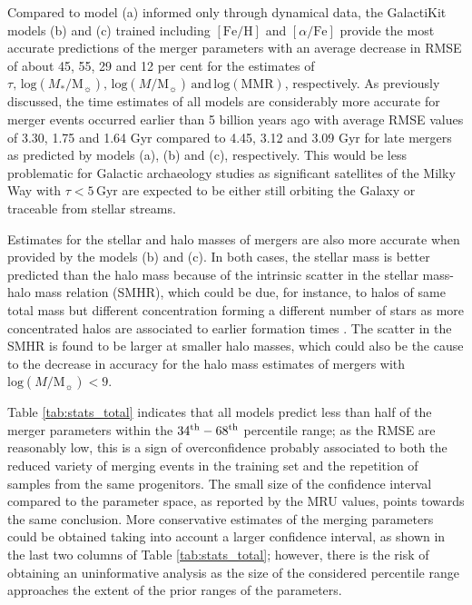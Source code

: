 Compared to model (a) informed only through dynamical data, the GalactiKit models (b) and (c) trained including $[\mathrm{Fe}/\mathrm{H}]$ and $[\alpha/\mathrm{Fe}]$ provide the most accurate predictions of the merger parameters with an average decrease in RMSE of about 45, 55, 29 and 12 per cent for the estimates of $\tau, \, \mathrm{log}(M_{*}/\mathrm{M}_{\sun}), \, \mathrm{log}(M/\mathrm{M}_{\sun}) \, \mathrm{and} \, \mathrm{log}(\text{MMR})$, respectively. As previously discussed, the time estimates of all models are considerably more accurate for merger events occurred earlier than 5 billion years ago with average RMSE values of 3.30, 1.75 and 1.64 Gyr compared to 4.45, 3.12 and 3.09 Gyr for late mergers as predicted by models (a), (b) and (c), respectively. This would be less problematic for Galactic archaeology studies as significant satellites of the Milky Way with $\tau<5\,\mathrm{Gyr}$ are expected to be either still orbiting the Galaxy or traceable from stellar streams.

Estimates for the stellar and halo masses of mergers are also more accurate when provided by the models (b) and (c). In both cases, the stellar mass is better predicted than the halo mass because of the intrinsic scatter in the stellar mass-halo mass relation (SMHR), which could be due, for instance, to halos of same total mass but different concentration forming a different number of stars as more concentrated halos are associated to earlier formation times \citep{Matthee2017}. The scatter in the SMHR is found to be larger at smaller halo masses, which could also be the cause to the decrease in accuracy for the halo mass estimates of mergers with $\mathrm{log}(M/\mathrm{M}_{\sun})<9$. 



Table \ref{tab:stats_total} indicates that all models predict less than half of the merger parameters within the $34^{\rm th}-68^{\rm th}$ percentile range; as the RMSE are reasonably low, this is a sign of overconfidence probably associated to both the reduced variety of merging events in the training set and the repetition of samples from the same progenitors. The small size of the confidence interval compared to the parameter space, as reported by the MRU values, points towards the same conclusion. More conservative estimates of the merging parameters could be obtained taking into account a larger confidence interval, as shown in the last two columns of Table \ref{tab:stats_total}; however, there is the risk of obtaining an uninformative analysis as the size of the considered percentile range approaches the extent of the prior ranges of the parameters.

